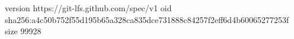 version https://git-lfs.github.com/spec/v1
oid sha256:a4c50b752f55d195b65a328ca835dce731888c84257f2eff6d4b60065277253f
size 99928
